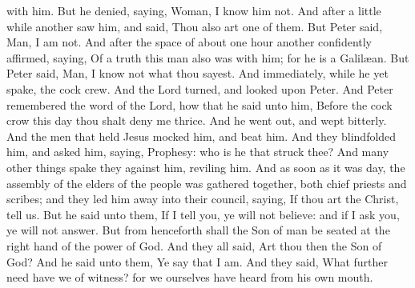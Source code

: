 with him. But he denied, saying, Woman, I know him not. And after a little while another saw him, and said, Thou also art one of them. But Peter said, Man, I am not. And after the space of about one hour another confidently affirmed, saying, Of a truth this man also was with him; for he is a Galilæan. But Peter said, Man, I know not what thou sayest. And immediately, while he yet spake, the cock crew. And the Lord turned, and looked upon Peter. And Peter remembered the word of the Lord, how that he said unto him, Before the cock crow this day thou shalt deny me thrice. And he went out, and wept bitterly.  And the men that held Jesus mocked him, and beat him. And they blindfolded him, and asked him, saying, Prophesy: who is he that struck thee? And many other things spake they against him, reviling him.  And as soon as it was day, the assembly of the elders of the people was gathered together, both chief priests and scribes; and they led him away into their council, saying, If thou art the Christ, tell us. But he said unto them, If I tell you, ye will not believe: and if I ask you, ye will not answer. But from henceforth shall the Son of man be seated at the right hand of the power of God. And they all said, Art thou then the Son of God? And he said unto them, Ye say that I am. And they said, What further need have we of witness? for we ourselves have heard from his own mouth. 

